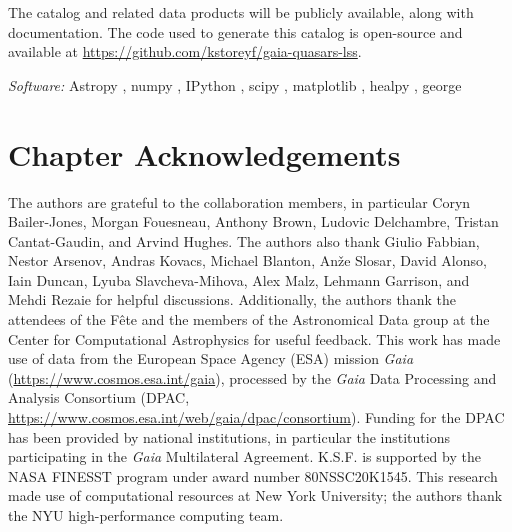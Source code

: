 The catalog and related data products will be publicly available, along with documentation.
The code used to generate this catalog is open-source and available at \url{https://github.com/kstoreyf/gaia-quasars-lss}.

\textit{Software:} Astropy \citep{the_astropy_collaboration_astropy_2013, the_astropy_collaboration_astropy_2018, the_astropy_collaboration_astropy_2022}, numpy \citep{VanDerWalt2011}, IPython \citep{Perez2007}, scipy \citep{Virtanen2020}, matplotlib \citep{Hunter2007}, healpy \citep{gorski_healpix_2005, zonca_healpy_2019}, george \citep{Ambikasaran2016}

\section{Chapter Acknowledgements}

The authors are grateful to the \Gaia collaboration members, in particular Coryn Bailer-Jones, Morgan Fouesneau, Anthony Brown, Ludovic Delchambre, Tristan Cantat-Gaudin, and Arvind Hughes.
The authors also thank Giulio Fabbian, Nestor Arsenov, Andras Kovacs, Michael Blanton, An\v{z}e Slosar, David Alonso, Iain Duncan, Lyuba Slavcheva-Mihova, Alex Malz, Lehmann Garrison, and Mehdi Rezaie for helpful discussions.
Additionally, the authors thank the attendees of the \Gaia F\^{e}te and the members of the Astronomical Data group at the Center for Computational Astrophysics for useful feedback.
This work has made use of data from the European Space Agency (ESA) mission {\it Gaia} (\url{https://www.cosmos.esa.int/gaia}), processed by the {\it Gaia} Data Processing and Analysis Consortium (DPAC, \url{https://www.cosmos.esa.int/web/gaia/dpac/consortium}). 
Funding for the DPAC has been provided by national institutions, in particular the institutions participating in the {\it Gaia} Multilateral Agreement.
K.S.F. is supported by the NASA FINESST program under award number 80NSSC20K1545.
This research made use of computational resources at New York University; the authors thank the NYU high-performance computing team.

